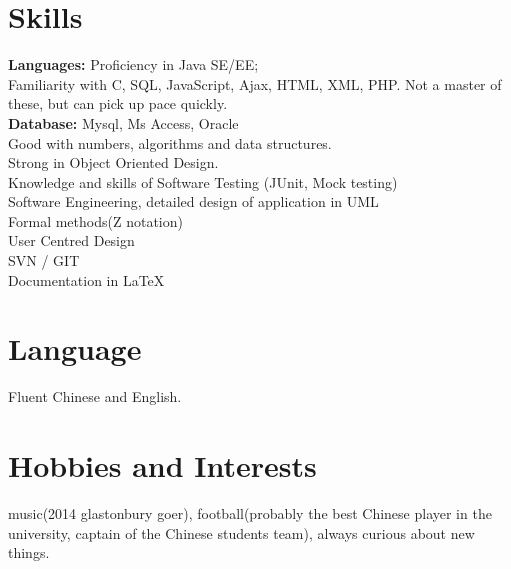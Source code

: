 \documentclass[margin]{res}
\begin{document}
\begin{resume}
\section{Skills}
  {\bf Languages:} Proficiency in Java SE/EE; \\
  Familiarity with C, SQL, JavaScript, Ajax, HTML, XML, PHP. Not a master
  of these, but can pick up pace quickly.\\
  {\bf Database:} Mysql, Ms Access, Oracle\\
  Good with numbers, algorithms and data structures.\\
  Strong in Object Oriented Design.\\ 
  Knowledge and skills of Software Testing (JUnit, Mock testing)\\
  Software Engineering, detailed design of application
  in UML\\
  Formal methods(Z notation)\\
  User Centred Design\\
  SVN / GIT\\  
  Documentation in \LaTeX
\section{Language} Fluent Chinese and English.
\section{Hobbies and Interests}
music(2014 glastonbury goer), football(probably the best Chinese player in the
university, captain of the Chinese students team), always curious about new
things.
\end{resume} 
\end{document}
